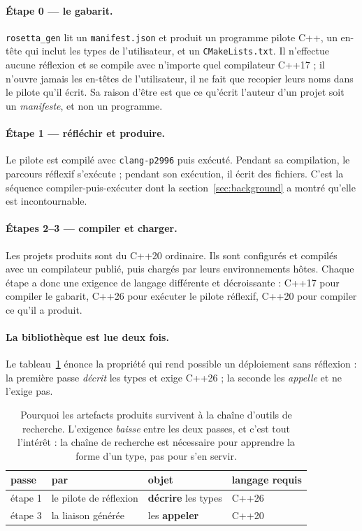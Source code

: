 \documentclass[11pt,a4paper]{article}
\newcommand{\code}[1]{\texttt{\small #1}}
\begin{document}
\paragraph{Étape 0 --- le gabarit.}
\code{rosetta\_gen} lit un \code{manifest.json} et produit un programme pilote
C++, un en-tête qui inclut les types de l'utilisateur, et un
\code{CMakeLists.txt}. Il n'effectue aucune réflexion et se compile avec
n'importe quel compilateur C++17 ; il n'ouvre jamais les en-têtes de
l'utilisateur, il ne fait que recopier leurs noms dans le pilote qu'il écrit. Sa
raison d'être est que ce qu'écrit l'auteur d'un projet soit un \emph{manifeste},
et non un programme.

\paragraph{Étape 1 --- réfléchir et produire.}
Le pilote est compilé avec \code{clang-p2996} puis exécuté. Pendant sa
compilation, le parcours réflexif s'exécute ; pendant son exécution, il écrit
des fichiers. C'est la séquence compiler-puis-exécuter dont la
section~\ref{sec:background} a montré qu'elle est incontournable.

\paragraph{Étapes 2--3 --- compiler et charger.}
Les projets produits sont du C++20 ordinaire. Ils sont configurés et compilés
avec un compilateur publié, puis chargés par leurs environnements hôtes. Chaque
étape a donc une exigence de langage différente et décroissante : C++17 pour
compiler le gabarit, C++26 pour exécuter le pilote réflexif, C++20 pour compiler
ce qu'il a produit.

\paragraph{La bibliothèque est lue deux fois.}
Le tableau~\ref{tab:twice} énonce la propriété qui rend possible un déploiement
sans réflexion : la première passe \emph{décrit} les types et exige C++26 ; la
seconde les \emph{appelle} et ne l'exige pas.

\begin{table}[h]
\centering\small
\begin{tabular}{llll}
\toprule
passe & par & objet & langage requis \\
\midrule
étape 1 & le pilote de réflexion & \textbf{décrire} les types & C++26 \\
étape 3 & la liaison générée & les \textbf{appeler} & C++20 \\
\bottomrule
\end{tabular}
\caption{Pourquoi les artefacts produits survivent à la chaîne d'outils de
recherche. L'exigence \emph{baisse} entre les deux passes, et c'est tout
l'intérêt : la chaîne de recherche est nécessaire pour apprendre la forme d'un
type, pas pour s'en servir.}
\label{tab:twice}
\end{table}
\end{document}
